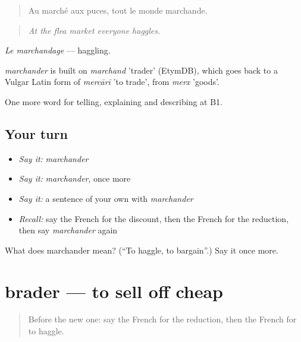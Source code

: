 \begin{quote}
Au marché aux puces, tout le monde marchande.
\end{quote}

\begin{quote}
\emph{At the flea market everyone haggles.}
\end{quote}

\emph{Le marchandage} — haggling.

\begin{cousinweb}
\emph{marchander} is built on \emph{marchand} 'trader' (EtymDB), which goes back to a Vulgar Latin form of \emph{mercārī} 'to trade', from \emph{merx} 'goods'.
\end{cousinweb}

\begin{grammarlens}[title={What you've built}]
One more word for telling, explaining and describing at B1.
\end{grammarlens}

\subsection*{Your turn}
\begin{itemize}
\raggedright
  \item \emph{Say it:} \emph{marchander}
  \item \emph{Say it:} \emph{marchander}, once more
  \item \emph{Say it:} a sentence of your own with \emph{marchander}
  \item \emph{Recall:} say the French for the discount, then the French for the reduction, then say \emph{marchander} again
\end{itemize}

\begin{tcolorbox}[breakable,colback=teal!4,colframe=teal!35!black,title={Before you move on}]
What does marchander mean? (\textquotedblleft{}To haggle, to bargain\textquotedblright{}.) Say it once more.
\end{tcolorbox}
\section[brader]{brader — to sell off cheap}

\label{lesson:FR-C452-brader}



\begin{quote}
Before the new one: say the French for the reduction, then the French for to haggle.
\end{quote}


